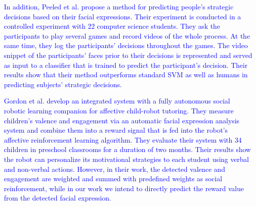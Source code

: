 \textcolor{blue}{In addition, Peeled et al. \cite{peled2013predicting} propose a method for predicting people's strategic decisions based on their facial expressions. Their experiment is conducted in a controlled experiment with 22 computer science students. They ask the participants to play several games and record videos of the whole process. At the same time, they log the participants' decisions throughout the games. %
The video snippet of the participants' faces prior to their decisions is represented and served as input to a classifier that is trained to predict the participant's decision. Their results show that their method outperforms standard SVM as well as humans in predicting subjects' strategic decisions.} 

\textcolor{blue}{Gordon et al. \cite{gordon2016affective} develop an integrated system with a fully autonomous social robotic learning companion for affective child-robot tutoring. They measure children's valence and engagement via an automatic facial expression analysis system and combine them into a reward signal that is fed into the robot's affective reinforcement learning algorithm. They evaluate their system with 34 children in preschool classrooms for a duration of two months. Their results show the robot can personalize its motivational strategies to each student using verbal and non-verbal actions. However, in their work, the detected valence and engagement are weighted and summed with predefined weights as social reinforcement, while in our work we intend to directly predict the reward value from the detected facial expression.}%

